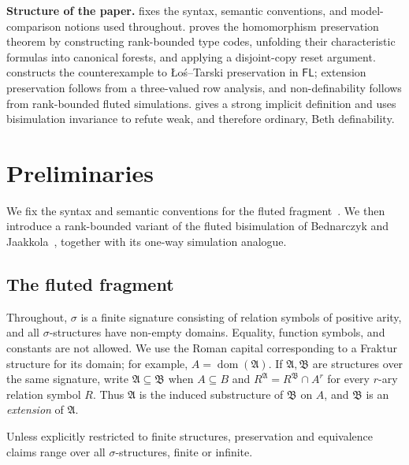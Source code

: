 \documentclass{lmcs}
\newcommand{\FL}{\mathsf{FL}}
\newcommand{\dom}{\operatorname{dom}}
\newcommand{\A}{\mathfrak{A}}
\newcommand{\B}{\mathfrak{B}}
\begin{document}
\noindent\textbf{Structure of the paper.}
 fixes the syntax, semantic conventions, and
model-comparison notions used throughout.   proves the
homomorphism preservation theorem by constructing rank-bounded type codes,
unfolding their characteristic formulas into canonical forests, and
applying a disjoint-copy reset argument.   constructs the
counterexample to \L o\'s--Tarski preservation in $\FL$; extension preservation
follows from a three-valued row analysis, and non-definability follows from
rank-bounded fluted simulations.   gives a strong implicit definition
and uses bisimulation invariance to refute weak, and therefore ordinary, Beth
definability.

\section{Preliminaries}\label{sec:unified-prelim}

We fix the syntax and semantic conventions for the fluted
fragment~\cite{PrattHartmann2023}.  We then introduce a rank-bounded variant
of the fluted bisimulation of Bednarczyk and
Jaakkola~\cite{BednarczykJaakkola2022}, together with its one-way simulation
analogue.

\subsection{The fluted fragment}\label{sec:fluted-fragment}

Throughout, $\sigma$ is a finite signature consisting of relation symbols of
positive arity, and all $\sigma$-structures have non-empty domains.  Equality,
function symbols, and constants are not allowed.  We use the Roman capital
corresponding to a Fraktur structure for its domain; for example,
$A=\dom(\A)$.  If $\A,\B$ are
structures over the same signature, write $\A\subseteq\B$ when $A\subseteq B$
and $R^{\A}=R^{\B}\cap A^r$ for every $r$-ary relation symbol $R$.  Thus
$\A$ is the induced substructure of $\B$ on $A$, and $\B$ is an
\emph{extension} of $\A$.

Unless explicitly restricted to finite structures, preservation and
equivalence claims range over all $\sigma$-structures, finite or infinite.
\end{document}
